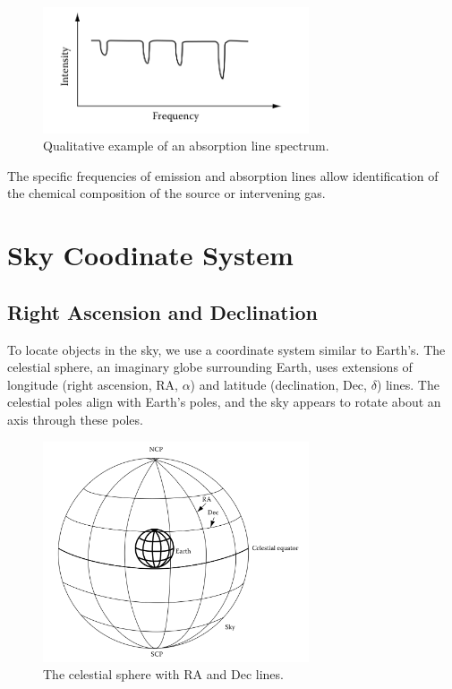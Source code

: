 \begin{enumerate}
    \begin{figure}[H]
        \centering
        \includegraphics[width=0.7\textwidth]{Images/absorption_spectrum.png}
        \caption{Qualitative example of an absorption line spectrum.}
        \label{fig:absorption_spectrum}
    \end{figure}
\end{enumerate}

The specific frequencies of emission and absorption lines allow identification of the chemical composition of the source or intervening gas.

\clearpage

\section{Sky Coodinate System}

\subsection{Right Ascension and Declination}
To locate objects in the sky, we use a coordinate system similar to Earth's. The celestial sphere, an imaginary globe surrounding Earth, uses extensions of longitude (right ascension, RA, $\alpha$) and latitude (declination, Dec, $\delta$) lines. The celestial poles align with Earth's poles, and the sky appears to rotate about an axis through these poles.

\begin{figure}[H]
    \centering
    \includegraphics[width=0.7\textwidth]{Images/ra_dec.png}
    \caption{The celestial sphere with RA and Dec lines.}
    \label{fig:ra_dec}
\end{figure}

